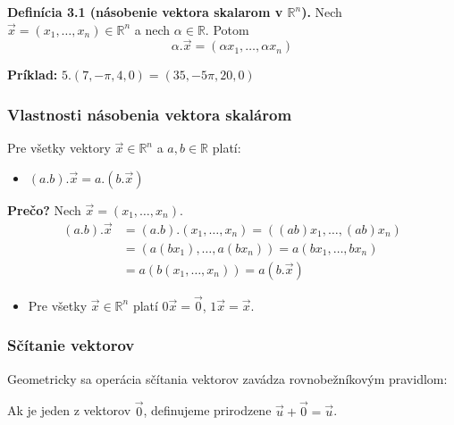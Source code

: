 \documentclass[11pt]{article}
\renewcommand{\vec}[1]{\overrightarrow{#1}}
\newcommand{\R}{\mathbb{R}}
\begin{document}
\vspace{1em}
\noindent\textbf{Definícia 3.1 (násobenie vektora skalarom v $\R^n$).}
Nech $\vec{x}=(x_1, \dots, x_n) \in \R^n$ a nech $\alpha \in \R$. Potom
$$ \alpha . \vec{x} = (\alpha x_1, \dots, \alpha x_n) $$

\noindent\textbf{Príklad:} $5 . (7, -\pi, 4, 0) = (35, -5\pi, 20, 0)$

\subsubsection{Vlastnosti násobenia vektora skalárom}
Pre všetky vektory $\vec{x} \in \R^n$ a $a,b \in \R$ platí:
\begin{itemize}
    \item $(a . b) . \vec{x} = a . (b . \vec{x})$
\end{itemize}
\textbf{Prečo?} Nech $\vec{x}=(x_1, \dots, x_n)$.
\begin{align*}
(a . b) . \vec{x} &= (a . b) . (x_1, \dots, x_n) = ((ab)x_1, \dots, (ab)x_n) \\
&= (a(bx_1), \dots, a(bx_n)) = a(bx_1, \dots, bx_n) \\
&= a(b(x_1, \dots, x_n)) = a(b . \vec{x})
\end{align*}
\begin{itemize}
    \item Pre všetky $\vec{x} \in \R^n$ platí $0\vec{x} = \vec{0}$, $1\vec{x} = \vec{x}$.
\end{itemize}

\hrulefill

\subsubsection{Sčítanie vektorov}
Geometricky sa operácia sčítania vektorov zavádza rovnobežníkovým pravidlom:
\begin{center}
\end{center}
Ak je jeden z vektorov $\vec{0}$, definujeme prirodzene $\vec{u}+\vec{0}=\vec{u}$.
\end{document}
